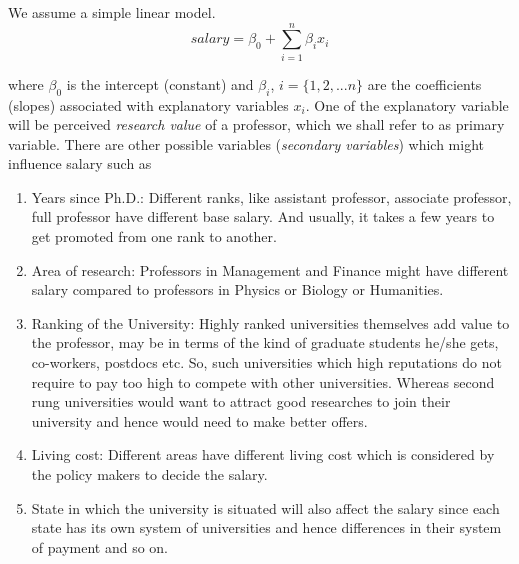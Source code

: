We assume a simple linear model.
\begin{equation}
salary = \beta_0 + \sum _{i=1}^{n} \beta_i x_i
\end{equation}

where $\beta_0$ is the intercept (constant) and $\beta_i$, $i = \{1,2,...n\}$ are the coefficients (slopes) associated with explanatory variables $x_i$. One of the explanatory variable will be perceived \emph{research value} of a professor, which we shall refer to as primary variable. There are other possible variables (\emph{secondary variables}) which might influence salary such as 
\begin{enumerate}
\item Years since Ph.D.: Different ranks, like assistant professor, associate professor, full professor have different base salary. And usually, it takes a few years to get promoted from one rank to another.
\item Area of research: Professors in Management and Finance might have different salary compared to professors in Physics or Biology or Humanities.  
\item Ranking of the University: Highly ranked universities themselves add value to the professor, may be in terms of the kind of graduate students he/she gets, co-workers, postdocs etc. So, such universities which high reputations do not require to pay too high to compete with other universities. Whereas second rung universities would want to attract good researches to join their university and hence would need to make better offers.
\item Living cost: Different areas have different living cost which is considered by the policy makers to decide the salary.
\item State in which the university is situated will also affect the salary since each state has its own system of universities and hence differences in their system of payment and so on.
\end{enumerate}
